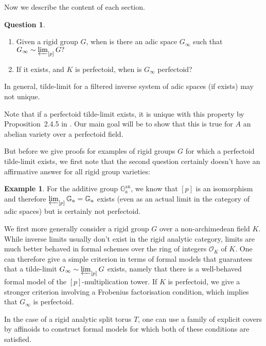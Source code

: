 \documentclass[10pt,oneside]{amsart}
\theoremstyle{definition}
\newtheorem{question}[mainthm]{Question}
\newtheorem*{example}{Example}
\begin{document}
 
Now we describe the content of each section. 

 
 
	\begin{question} \label{question_intro}
	    \begin{enumerate} 
	    \item		Given a rigid group $G$, when is there an adic space $G_\infty$ such that $G_\infty \sim  \varprojlim_{[p]} G ?$
	    \item If it exists, and $K$ is perfectoid, when is $G_\infty$ perfectoid?
	    \end{enumerate}
	\end{question}
 
	
	

In general, tilde-limit for a filtered inverse system of adic spaces (if exists) may not unique. 


	Note that if a perfectoid tilde-limit exists, it is unique with this property by Proposition~2.4.5 in \cite{SW}.
	Our main goal will be to show that this is true for $A$ an abelian variety over a perfectoid field.
	
	
	
	But before we give proofs for examples of rigid groups $G$ for which a perfectoid tilde-limit exists, we first note that the second question certainly doesn't have an affirmative answer for all rigid group varieties:
	\begin{example}
		For the additive group $\mathbb G_a^{\operatorname{an}}$, we know that $[p]$ is an isomorphism and therefore $\varprojlim_{[p]} \mathbb G_a=\mathbb G_a$ exists (even as an actual limit in the category of adic spaces) but is certainly not perfectoid.
	\end{example}


We first more generally consider a rigid group  $G$ over a non-archimedean field $K$. While inverse limits usually don't exist in the rigid analytic category, limits are much better behaved in formal schemes over the ring of integers $\mathcal O_K$ of $K$. One can therefore give a simple criterion in terms of formal models that guarantees that a tilde-limit $G_\infty \sim\varprojlim_{[p]} G$ exists, namely that there is a well-behaved formal model of the $[p]$-multiplication tower.
If $K$ is perfectoid, we give a stronger criterion involving a Frobenius factorisation condition, which implies that $G_\infty$ is perfectoid.

In the case of a rigid analytic split torus $T$, one can use a family of explicit covers by affinoids to construct formal models for which both of these conditions are satisfied. 
\end{document}
